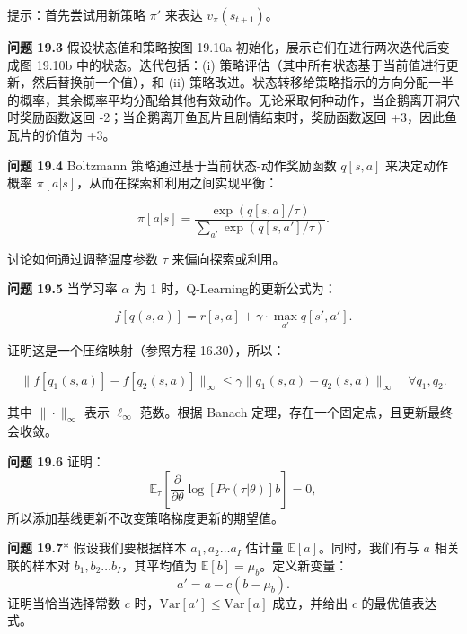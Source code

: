 提示：首先尝试用新策略 \(\pi'\) 来表达 \(v_{\pi}(s_{t+1})\)。

\textbf{问题 19.3} 假设状态值和策略按图 19.10a 初始化，展示它们在进行两次迭代后变成图 19.10b 中的状态。迭代包括：(i) 策略评估（其中所有状态基于当前值进行更新，然后替换前一个值），和 (ii) 策略改进。状态转移给策略指示的方向分配一半的概率，其余概率平均分配给其他有效动作。无论采取何种动作，当企鹅离开洞穴时奖励函数返回 -2；当企鹅离开鱼瓦片且剧情结束时，奖励函数返回 +3，因此鱼瓦片的价值为 +3。

\textbf{问题 19.4} Boltzmann 策略通过基于当前状态-动作奖励函数 \(q[s, a]\) 来决定动作概率 \(\pi[a|s]\)，从而在探索和利用之间实现平衡：

\begin{equation}
\pi[a|s] = \frac{\exp(q[s, a]/\tau)}{\sum_{a'} \exp(q[s, a']/\tau)}. 
\end{equation}

讨论如何通过调整温度参数 \(\tau\) 来偏向探索或利用。

\textbf{问题 19.5} 当学习率 \(\alpha\) 为 1 时，Q-Learning的更新公式为：

\begin{equation}
f[q(s, a)] = r[s, a] + \gamma \cdot \max_{a'} q[s', a']. 
\end{equation}

证明这是一个压缩映射（参照方程 16.30），所以：

\begin{equation}
\| f[q_1(s, a)] - f[q_2(s, a)] \|_{\infty} \leq \gamma \| q_1(s, a) - q_2(s, a) \|_{\infty} \quad \forall q_1, q_2. 
\end{equation}

其中 \(\| \cdot \|_{\infty}\) 表示 \(\ell_{\infty}\) 范数。根据 Banach 定理，存在一个固定点，且更新最终会收敛。

\textbf{问题 19.6} 证明：
\begin{equation}
\mathbb{E}_\tau \left[ \frac{\partial}{\partial \theta} \log[Pr(\tau|\theta)]b \right] = 0, 
\end{equation}
所以添加基线更新不改变策略梯度更新的期望值。

\textbf{问题 19.7}* 假设我们要根据样本 \(a_1, a_2 \ldots a_I\) 估计量 \(\mathbb{E}[a]\)。同时，我们有与 \(a\) 相关联的样本对 \(b_1, b_2 \ldots b_I\)，其平均值为 \(\mathbb{E}[b] = \mu_b\)。定义新变量：
\begin{equation}
a' = a - c(b - \mu_b). 
\end{equation}
证明当恰当选择常数 \(c\) 时，\(\text{Var}[a'] \leq \text{Var}[a]\) 成立，并给出 \(c\) 的最优值表达式。

